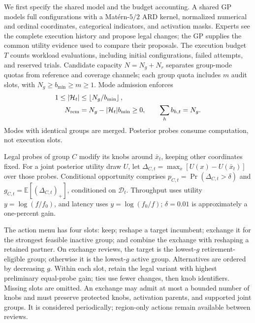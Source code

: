 \documentclass[runningheads]{llncs}
\begin{document}
We first specify the shared model and the budget accounting. A shared GP
models full configurations with a Mat\'ern-$5/2$ ARD kernel, normalized
numerical and ordinal coordinates, categorical indicators, and activation
masks. Experts see the complete execution history and propose legal changes;
the GP supplies the common utility evidence used to compare their proposals.
The execution budget $T$ counts workload evaluations, including initial
configurations, failed attempts, and reserved trials. Candidate capacity
$N=N_g+N_r$ separates group-mode quotas from reference and coverage channels;
each group quota includes $m$ audit slots, with $N_g\geq b_{\min}\geq m\geq1$.
Mode admission enforces
\begin{equation}
\begin{aligned}
 1\leq|\mathcal H_t|&\leq\left\lfloor N_g/b_{\min}\right\rfloor,\\
 N_{\rm rem}&=N_g-|\mathcal H_t|b_{\min}\geq0,\qquad
 \sum_hb_{h,t}=N_g.
\end{aligned}
\label{eq:ct-accounting}
\end{equation}
Modes with identical groups are merged. Posterior probes consume
computation, not execution slots.

Legal probes of group $C$ modify its knobs around $\bar x_t$, keeping
other coordinates fixed. For a joint posterior utility draw $U$, let
$\Delta_{C,t}=\max_x[U(x)-U(\bar x_t)]$ over those probes.
Conditional opportunity comprises $p_{C,t}=\Pr(\Delta_{C,t}>\delta)$ and
$g_{C,t}=\mathbb E[(\Delta_{C,t})_+]$, conditioned on $\mathcal D_t$.
Throughput uses utility $y=\log(f/f_0)$, and latency uses
$y=\log(f_0/f)$; $\delta=0.01$ is approximately a one-percent gain.

The action menu has four slots: keep; reshape a target incumbent; exchange
it for the strongest feasible inactive group; and combine the exchange
with reshaping a retained partner. On exchange reviews, the target is the
lowest-$g$ retirement-eligible group; otherwise it is the lowest-$g$ active
group. Alternatives are ordered by decreasing $g$. Within each slot,
retain the legal variant with highest preliminary equal-probe gain;
ties use fewer changes, then knob identifiers. Missing slots are omitted.
An exchange may admit at most a bounded number of knobs and must preserve
protected knobs, activation parents, and supported joint groups. It is
considered periodically; region-only actions remain available between
reviews.
\end{document}

